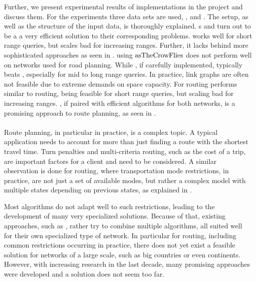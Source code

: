 	Further, we present experimental results of implementations in the \cobweb project  and discuss them. For the experiments three data sets are used,
	\freiburgR, \stuttgartR and \switzerlandR. The setup, as well as the structure of the input data, is thoroughly explained.
	{\coverTree}s and \csa turn out to be a a very efficient solution to their corresponding problems. \dijkstra works well for short range queries,
	but scales bad for increasing ranges. Further, it lacks behind more sophisticated approaches as seen in .
	\astar using $\operatorname{asTheCrowFlies}$ does not perform well on networks used for road planning. While \alt, if carefully implemented, typically beats \dijkstra,
	especially for mid to long range queries. In practice, link graphs are often not feasible due to extreme demands on space capacity. For \multiModal routing
	\dijkstra performs similar to \uniModal routing, being feasible for short range queries, but scaling bad for increasing ranges. \anr, if paired with efficient algorithms
	for both networks, is a promising approach to \multiModal route planning, as seen in .\\\\
	Route planning, in particular in practice, is a complex topic. A typical application needs to account for more than just finding a route with the shortest travel time.
	Turn penalties and multi-criteria routing, such as the cost of a trip, are important factors for a client and need to be considered. A similar observation is done
	for \multiModal routing, where transportation mode restrictions, in practice, are not just a set of available modes, but rather a complex model with
	multiple states depending on previous states, as explained in .
	
	Most algorithms do not adapt well to such restrictions, leading to the development of many very specialized solutions. Because of that, existing
	approaches, such as \anr, rather try to combine multiple algorithms, all suited well for their own specialized type of network. In particular
	for \multiModal routing, including common restrictions occurring in practice, there does not yet exist a feasible solution for networks of a large scale,
	such as big countries or even continents. However, with increasing research in the last decade, many promising approaches were developed and
	a solution does not seem too far.